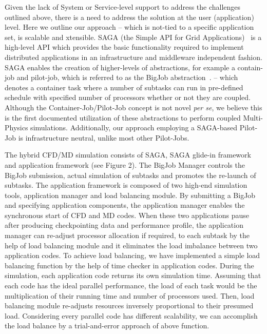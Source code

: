 \documentclass[a4paper]{article}
\begin{document}
Given the lack of System or Service-level support to address the challenges outlined above, there is a need to address the solution at the user (application) level.  Here we outline our approach -- which is not-tied to a specific application set, is scalable and xtensible. SAGA (the Simple API for Grid Applications)~\cite{Jha:2008} is a high-level API which provides the basic functionality required to implement distributed applications in an infrastructure and middleware independent fashion.
SAGA enables the creation of higher-levels of abstractions, for example a contain-job and pilot-job, which is referred to as the BigJob abstraction~\cite{Jha:2009}.
-- which denotes a container task where a number of subtasks can run in pre-defined schedule with specified number of processors whether or not they are coupled.  Although the Container-Job/Pilot-Job concept is not novel {\it per se}, we believe this is the first documented utilization of these abstractions to perform coupled Multi-Physics simulations. Additionally, our approach employing a SAGA-based Pilot-Job is infrastructure neutral, unlike most other Pilot-Jobs.

The hybrid CFD/MD simulation consists of SAGA, SAGA glide-in framework and application framework (see Figure 2).  The BigJob Manager controls the BigJob submission, actual simulation of subtasks and promotes the re-launch of subtasks. The application framework is composed of two high-end simulation tools, application manager and load balancing module. By submitting a BigJob and specifying application components, the application manager enables the synchronous start of CFD and MD codes. When these two applications pause after producing checkpointing data and performance profile, the application manager can re-adjust processor allocation if required, to each subtask by the help of load balancing module and it eliminates the load imbalance between two application codes.  To achieve load balancing, we have implemented a simple load balancing function by the help of time checker in application codes. During the simulation, each application code returns its own simulation time. Assuming that each code has the ideal parallel performance, the load of each task would be the multiplication of their running time and number of processors used. Then, load balancing module re-adjusts resources inversely proportional to their presumed load. Considering every parallel code has different scalability, we can accomplish the load balance by a trial-and-error approach of above function.
\end{document}
